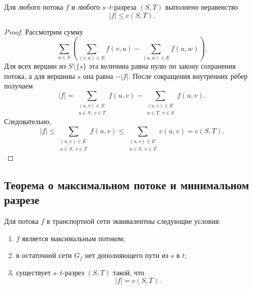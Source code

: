 \begin{Proposition}{}{}
	Для любого потока $f$ и любого $s$--$t$-разреза $(S,T)$ выполнено неравенство
	\[
	|f|\le c(S,T).
	\]
\end{Proposition}

\begin{proof}
	Рассмотрим сумму
	\[
	\sum_{u\in S}
	\left(
	\sum_{(v,u)\in E} f(v,u)
	-
	\sum_{(u,w)\in E} f(u,w)
	\right).
	\]
	Для всех вершин из $S\setminus\{s\}$ эта величина равна нулю по закону сохранения потока, а для вершины $s$ она равна $-|f|$. После сокращения внутренних рёбер получаем
	\[
	|f|=
	\sum_{\substack{(u,v)\in E\\ u\in S,\ v\in T}} f(u,v)
	-
	\sum_{\substack{(u,v)\in E\\ u\in T,\ v\in S}} f(u,v).
	\]
	Следовательно,
	\[
	|f|
	\le
	\sum_{\substack{(u,v)\in E\\ u\in S,\ v\in T}} f(u,v)
	\le
	\sum_{\substack{(u,v)\in E\\ u\in S,\ v\in T}} c(u,v)
	=
	c(S,T).
	\]
\end{proof}

\subsection{Теорема о максимальном потоке и минимальном разрезе}

\begin{Theorem}{}{}
	Для потока $f$ в транспортной сети эквивалентны следующие условия:
	\begin{enumerate}[label=\arabic*)]
		\item $f$ является максимальным потоком;
		\item в остаточной сети $G_f$ нет дополняющего пути из $s$ в $t$;
		\item существует $s$--$t$-разрез $(S,T)$ такой, что
		\[
		|f|=c(S,T).
		\]
	\end{enumerate}
\end{Theorem}

